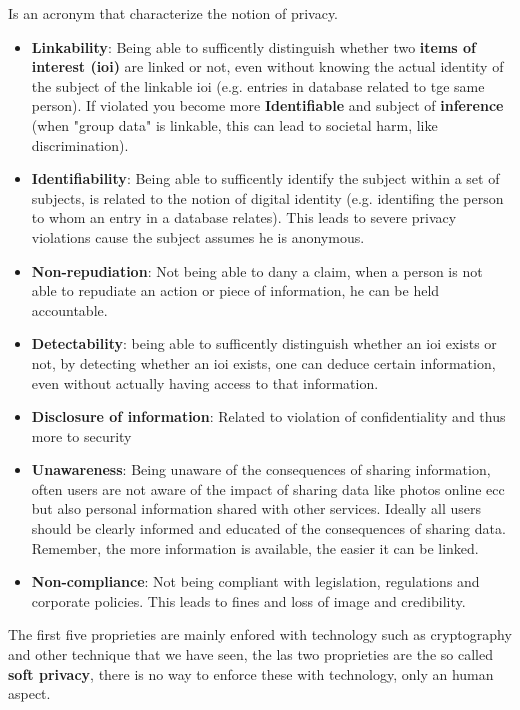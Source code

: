 Is an acronym that characterize the notion of privacy.
\begin{itemize}
    \item \textbf{Linkability}: Being able to sufficently distinguish whether two \textbf{items of interest (ioi)} are linked or not, even without knowing the actual identity of the subject of the linkable ioi (e.g. entries in database related to tge same person). If violated you become more \textbf{Identifiable} and subject of \textbf{inference} (when "group data" is linkable, this can lead to societal harm, like discrimination).  
    \item \textbf{Identifiability}: Being able to sufficently identify the subject within a set of subjects, is related to the notion of digital identity (e.g. identifing the person to whom an entry in a database relates). This leads to severe privacy violations cause the subject assumes he is anonymous.
    \item \textbf{Non-repudiation}: Not being able to dany a claim, when a person is not able to repudiate an action or piece of information, he can be held accountable.
    \item \textbf{Detectability}: being able to sufficently distinguish whether an ioi exists or not, by detecting whether an ioi exists, one can deduce certain information, even without actually having access to that information.
    \item \textbf{Disclosure of information}: Related to violation of confidentiality and thus more to security
    \item \textbf{Unawareness}: Being unaware of the consequences of sharing information, often users are not aware of the impact of sharing data like photos online ecc but also personal information shared with other services. Ideally all users should be clearly informed and educated of the consequences of sharing data. Remember, the more information is available, the easier it can be linked.
    \item \textbf{Non-compliance}: Not being compliant with legislation, regulations and corporate policies. This leads to fines and loss of image and credibility.
\end{itemize}

The first five proprieties are mainly enfored with technology such as cryptography and other technique that we have seen, the las two proprieties are the so called \textbf{soft privacy}, there is no way to enforce these with technology, only an human aspect.

